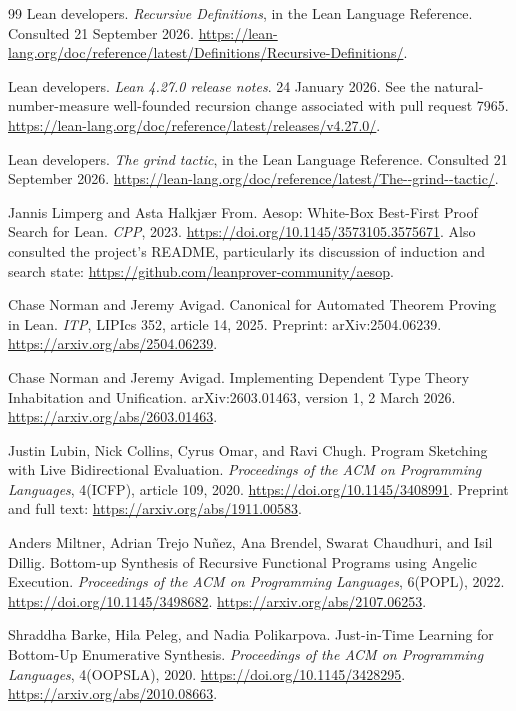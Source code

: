 \begin{thebibliography}{99}
 Lean developers.
\emph{Recursive Definitions}, in the Lean Language Reference.
Consulted 21 September 2026.
\url{https://lean-lang.org/doc/reference/latest/Definitions/Recursive-Definitions/}.

 Lean developers.
\emph{Lean 4.27.0 release notes}.
24 January 2026. See the natural-number-measure well-founded recursion change associated with pull request 7965.
\url{https://lean-lang.org/doc/reference/latest/releases/v4.27.0/}.

 Lean developers.
\emph{The grind tactic}, in the Lean Language Reference.
Consulted 21 September 2026.
\url{https://lean-lang.org/doc/reference/latest/The--grind--tactic/}.

 Jannis Limperg and Asta Halkj\ae r From.
Aesop: White-Box Best-First Proof Search for Lean.
\emph{CPP}, 2023.
\url{https://doi.org/10.1145/3573105.3575671}.
Also consulted the project's README, particularly its discussion of induction and search state:
\url{https://github.com/leanprover-community/aesop}.

 Chase Norman and Jeremy Avigad.
Canonical for Automated Theorem Proving in Lean.
\emph{ITP}, LIPIcs 352, article 14, 2025.
Preprint: arXiv:2504.06239.
\url{https://arxiv.org/abs/2504.06239}.

 Chase Norman and Jeremy Avigad.
Implementing Dependent Type Theory Inhabitation and Unification.
arXiv:2603.01463, version 1, 2 March 2026.
\url{https://arxiv.org/abs/2603.01463}.

 Justin Lubin, Nick Collins, Cyrus Omar, and Ravi Chugh.
Program Sketching with Live Bidirectional Evaluation.
\emph{Proceedings of the ACM on Programming Languages}, 4(ICFP), article 109, 2020.
\url{https://doi.org/10.1145/3408991}.
Preprint and full text: \url{https://arxiv.org/abs/1911.00583}.

 Anders Miltner, Adrian Trejo Nu\~nez, Ana Brendel, Swarat Chaudhuri, and Isil Dillig.
Bottom-up Synthesis of Recursive Functional Programs using Angelic Execution.
\emph{Proceedings of the ACM on Programming Languages}, 6(POPL), 2022.
\url{https://doi.org/10.1145/3498682}.
\url{https://arxiv.org/abs/2107.06253}.

 Shraddha Barke, Hila Peleg, and Nadia Polikarpova.
Just-in-Time Learning for Bottom-Up Enumerative Synthesis.
\emph{Proceedings of the ACM on Programming Languages}, 4(OOPSLA), 2020.
\url{https://doi.org/10.1145/3428295}.
\url{https://arxiv.org/abs/2010.08663}.


\end{thebibliography}
